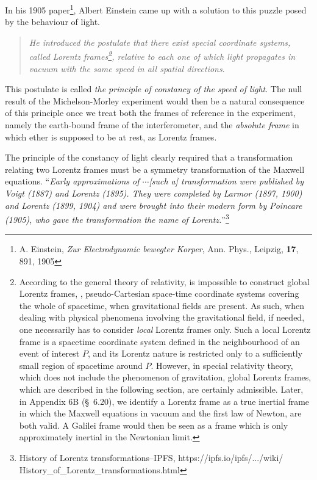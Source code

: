 \begin{small}
In his 1905 paper\footnote{A. Einstein, \textsl{Zur 
Electrodynamic bewegter Korper}, Ann. Phys., Leipzig, 
\textbf{17}, 891, 1905},  Albert Einstein came up with a 
solution to this puzzle posed by the behaviour of light. 
\begin{quote}
\textsl{He introduced the postulate that there exist special 
coordinate systems, called \textsl{Lorentz 
frames}\footnote{According to the general theory of 
relativity, is impossible to construct global Lorentz 
frames, \ie, pseudo-Cartesian space-time coordinate systems 
covering the whole of spacetime, when gravitational fields 
are present. As such, when dealing with physical phenomena 
involving the gravitational field, if needed, one 
necessarily has to consider \textsl{local} Lorentz frames 
only. Such a local Lorentz frame is a spacetime coordinate 
system defined in the neighbourhood of an event of interest 
$P$, and its Lorentz nature is restricted only to a 
sufficiently small region of spacetime around $P$. However, 
in special relativity theory, which does not include the 
phenomenon of gravitation, global Lorentz frames, which are 
described in the following section, are certainly 
admissible. Later, in Appendix 6B (\S~6.20), we identify a 
Lorentz frame as a true inertial frame in which the Maxwell 
equations in vacuum and the first law of Newton, are both 
valid. A Galilei frame would then be seen as a frame which 
is only approximately inertial in the Newtonian limit.}, 
relative to each one of which light propagates in vacuum 
with the same speed in all spatial directions}.
\end{quote}
This postulate is called \textsl{the principle of constancy 
of the speed of light}. The null result of the 
Michelson-Morley experiment would then be a natural 
consequence of this principle once we treat both the frames 
of reference in the experiment, namely the earth-bound 
frame 
of the interferometer, and the \textsl{absolute frame} in 
which ether is supposed to be at rest, as Lorentz frames.

The principle of the constancy of light clearly  required 
that a transformation relating two Lorentz frames must be a 
symmetry transformation of the Maxwell equations. 
``\textsl{Early approximations of $\cdots$[such a] 
transformation were published by Voigt (1887) and Lorentz 
(1895). They were completed by Larmor (1897, 1900) and 
Lorentz (1899, 1904) and were brought into their modern 
form by Poincare (1905), who gave the transformation the 
name of Lorentz.{}}''{}{}\footnote{History of Lorentz 
transformations--IPFS, https://ipfs.io/ipfs/.../wiki/
History\_of\_Lorentz\_transformations.html}


\end{small}
